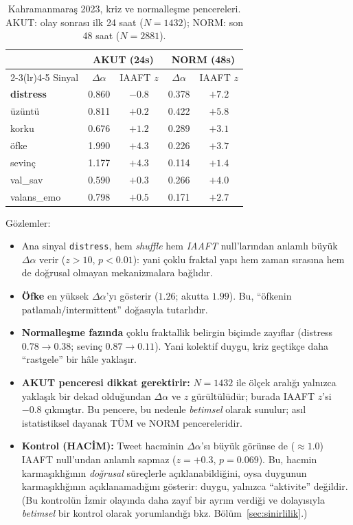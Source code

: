 \documentclass[11pt,a4paper]{article}
\newcommand{\Dal}{\Delta\alpha}
\begin{document}
\begin{table}[H]
\centering
\small
\caption{Kahramanmaraş 2023, kriz ve normalleşme pencereleri. AKUT: olay
sonrası ilk 24 saat ($N=1432$); NORM: son 48 saat ($N=2881$).}
\label{tab:kmfaz}
\begin{tabular}{lcccc}
\toprule
& \multicolumn{2}{c}{AKUT (24s)} & \multicolumn{2}{c}{NORM (48s)}\\
\cmidrule(lr){2-3}\cmidrule(lr){4-5}
Sinyal & $\Dal$ & IAAFT $z$ & $\Dal$ & IAAFT $z$\\
\midrule
\textbf{distress} & 0.860 & $-0.8$ & 0.378 & $+7.2$\\
üzüntü           & 0.811 & $+0.2$ & 0.422 & $+5.8$\\
korku            & 0.676 & $+1.2$ & 0.289 & $+3.1$\\
öfke             & 1.990 & $+4.3$ & 0.226 & $+3.7$\\
sevinç           & 1.177 & $+4.3$ & 0.114 & $+1.4$\\
val\_sav         & 0.590 & $+0.3$ & 0.266 & $+4.0$\\
valans\_emo      & 0.798 & $+0.5$ & 0.171 & $+2.7$\\
\bottomrule
\end{tabular}
\end{table}

Gözlemler:
\begin{itemize}[leftmargin=1.4em]
  \item Ana sinyal \texttt{distress}, hem \emph{shuffle} hem \emph{IAAFT}
        null'larından anlamlı büyük $\Dal$ verir ($z>10$, $p<0.01$): yani
        çoklu fraktal yapı hem zaman sırasına hem de doğrusal olmayan
        mekanizmalara bağlıdır.
  \item \textbf{Öfke} en yüksek $\Dal$'yı gösterir ($1.26$; akutta $1.99$).
        Bu, ``öfkenin patlamalı/intermittent'' doğasıyla tutarlıdır.
  \item \textbf{Normalleşme fazında} çoklu fraktallik belirgin biçimde
        zayıflar (distress $0.78 \to 0.38$; sevinç $0.87 \to 0.11$). Yani
        kolektif duygu, kriz geçtikçe daha ``rastgele'' bir hâle yaklaşır.
  \item \textbf{AKUT penceresi dikkat gerektirir:} $N=1432$ ile ölçek aralığı
        yalnızca yaklaşık bir dekad olduğundan $\Delta\alpha$ ve $z$ gürültülüdür;
        burada IAAFT $z$'si $-0.8$ çıkmıştır. Bu pencere, bu nedenle
        \emph{betimsel} olarak sunulur; asıl istatistiksel dayanak TÜM ve NORM
        pencereleridir.
  \item \textbf{Kontrol (HACİM):} Tweet hacminin $\Dal$'sı büyük görünse de
        ($\approx 1.0$) IAAFT null'undan anlamlı sapmaz ($z=+0.3$, $p=0.069$).
        Bu, hacmin karmaşıklığının \emph{doğrusal} süreçlerle açıklanabildiğini,
        oysa duygunun karmaşıklığının açıklanamadığını gösterir: duygu,
        yalnızca ``aktivite'' değildir. (Bu kontrolün İzmir olayında daha
        zayıf bir ayrım verdiği ve dolayısıyla \emph{betimsel} bir kontrol olarak
        yorumlandığı bkz. Bölüm~\ref{sec:sinirlilik}.)
\end{itemize}
\end{document}
